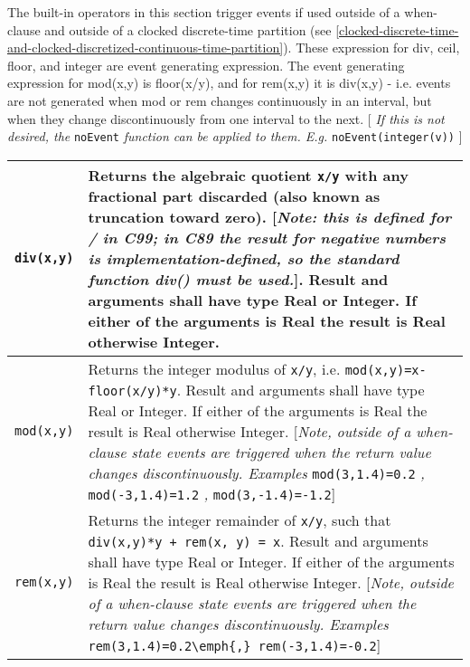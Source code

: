 The built-in operators in this section trigger events if used outside of
a when-clause and outside of a clocked discrete-time partition (see
\autoref{clocked-discrete-time-and-clocked-discretized-continuous-time-partition}). 
These expression for div, ceil, floor, and integer are
event generating expression. The event generating expression for
mod(x,y) is floor(x/y), and for rem(x,y) it is div(x,y) - i.e. events
are not generated when mod or rem changes continuously in an interval,
  but when they change discontinuously from one interval to the next. {[}
\emph{If this is not desired, the} \lstinline[basicstyle=\ttfamily]!noEvent! \emph{function can be applied
to them. E.g.} \lstinline[basicstyle=\ttfamily]!noEvent(integer(v))! {]}

\begin{longtable}{|p{2cm}|p{12cm}|} \hline
\endhead
\lstinline[basicstyle=\ttfamily]!div(x,y)! & Returns the algebraic quotient \lstinline[basicstyle=\ttfamily]!x/y! with any fractional part
discarded (also known as truncation toward zero). {[}\emph{Note: this is
defined for / in C99; in C89 the result for negative numbers is
implementation-defined, so the standard function div() must be
used.}{]}. Result and arguments shall have type Real or Integer. If
either of the arguments is Real the result is Real otherwise
Integer.\\ \hline
\lstinline[basicstyle=\ttfamily]!mod(x,y)! & Returns the integer modulus of \lstinline[basicstyle=\ttfamily]!x/y!, i.e.
\lstinline[basicstyle=\ttfamily]!mod(x,y)=x-floor(x/y)*y!. Result and arguments shall have type Real or
Integer. If either of the arguments is Real the result is Real otherwise
Integer. {[}\emph{Note, outside of a when-clause state events are
triggered when the return value changes discontinuously. Examples}
\lstinline[basicstyle=\ttfamily]!mod(3,1.4)=0.2! \emph{,} \lstinline[basicstyle=\ttfamily]!mod(-3,1.4)=1.2! \emph{,}
\lstinline[basicstyle=\ttfamily]!mod(3,-1.4)=-1.2!{]}\\ \hline
\lstinline[basicstyle=\ttfamily]!rem(x,y)! & Returns the integer remainder of \lstinline[basicstyle=\ttfamily]!x/y!, such that \lstinline[basicstyle=\ttfamily]!div(x,y)*y + rem(x, y) = x!. Result and arguments shall have type Real or Integer. If
either of the arguments is Real the result is Real otherwise Integer.
{[}\emph{Note, outside of a when-clause state events are triggered when
the return value changes discontinuously. Examples}
\lstinline[basicstyle=\ttfamily]!rem(3,1.4)=0.2\emph{,} rem(-3,1.4)=-0.2!{]}\\ \hline

\end{longtable}
